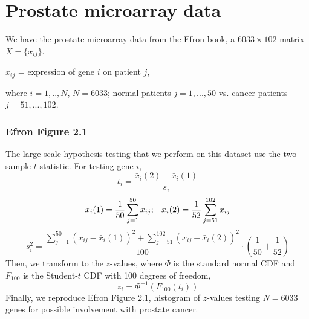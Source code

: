 \documentclass{article}
\begin{document}
\newpage
\section*{Prostate microarray data}
\hspace{12 pt} We have the prostate microarray data from the Efron
book, a $6033 \times 102$ matrix $X=\{x_{ij}\}$.
\begin{center}
$x_{ij}$ = expression of gene $i$ on patient $j$, 
\end{center}
where $i=1,..,N$, $N=6033$; normal patients $j=1,...,50$ vs. cancer
patients $j=51,...,102$.


\subsubsection*{Efron Figure 2.1}
\hspace{12 pt} The large-scale hypothesis testing that we perform on
this dataset use the two-sample $t$-statistic. \newline
For testing gene $i$,
\begin{displaymath}
t_i = \frac{\bar{x}_i(2) - \bar{x}_i(1)}{s_i}
\end{displaymath}
\begin{displaymath}
\bar{x}_i(1) = \frac{1}{50} \sum_{j=1}^{50} x_{ij} ; \hspace{8 pt}
\bar{x}_i(2) = \frac{1}{52} \sum_{j=51}^{102} x_{ij}
\end{displaymath}
\begin{displaymath}
s_i^2 = \frac{\sum_{j=1}^{50} (x_{ij} - \bar{x}_i(1))^2 +
  \sum_{j=51}^{102} (x_{ij} - \bar{x}_i(2))^2 }{100} \cdot (\frac{1}{50} + \frac{1}{52}) 
\end{displaymath}
Then, we transform to the $z$-values, 
where $\Phi$ is the standard normal CDF and $F_{100}$ is the Student-$t$ CDF
with 100 degrees of freedom,
\begin{displaymath}
z_i = \Phi^{-1}(F_{100}(t_i))
\end{displaymath}
Finally, we reproduce Efron
Figure 2.1, histogram of $z$-values testing $N=6033$ genes
for possible involvement with prostate cancer.

\end{document}
